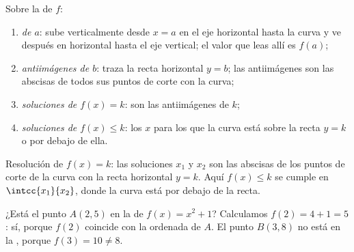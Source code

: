 \begin{method}\label{met:g10:functions:reading}
Sobre la  de $f$:
\begin{enumerate}
  \item \emph{ de $a$}: sube verticalmente desde $x = a$ en el eje
        horizontal hasta la curva y ve después en horizontal hasta el eje
        vertical; el valor que leas allí es $f(a)$;
  \item \emph{antiimágenes de $b$}: traza la recta horizontal $y = b$; las
        antiimágenes son las abscisas de todos sus puntos de corte con la
        curva;
  \item \emph{soluciones de $f(x) = k$}: son las antiimágenes de $k$;
  \item \emph{soluciones de $f(x) \leq k$}: los $x$ para los que la curva
        está sobre la recta $y = k$ o por debajo de ella.
\end{enumerate}
\end{method}

\begin{omfigure}

{\small Resolución  de $f(x) = k$: las soluciones $x_1$ y $x_2$ son
las abscisas de los puntos de corte de la curva con la recta horizontal
$y = k$. Aquí $f(x) \leq k$ se cumple en $\intcc{x_1}{x_2}$, donde la
curva está por debajo de la recta.}
\end{omfigure}

\begin{example}\label{ex:g10:functions:membership}
¿Está el punto $A(2, 5)$ en la  de $f(x) = x^2 + 1$? Calculamos
$f(2) = 4 + 1 = 5$: sí, porque $f(2)$ coincide con la ordenada de $A$. El
punto $B(3, 8)$ no está en la , porque $f(3) = 10 \neq 8$.
\end{example}

